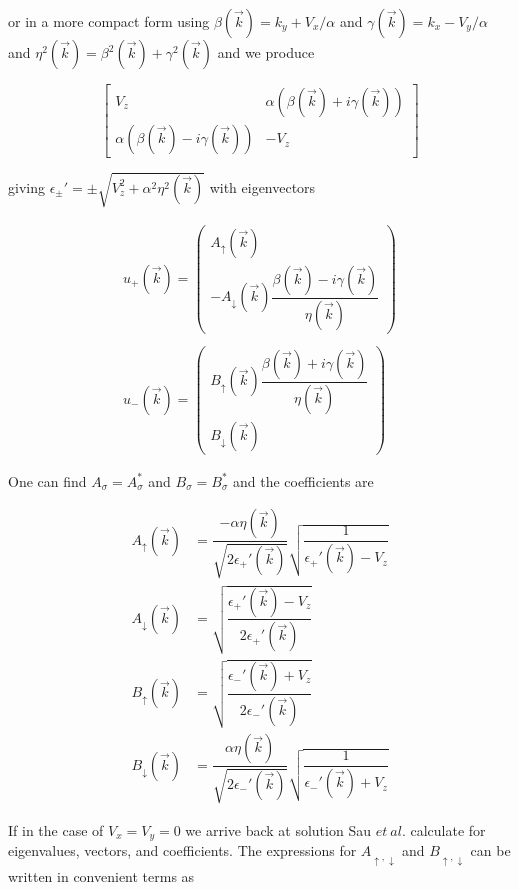 or in a more compact form using $\beta(\vec{k}) = k_y + V_x/\alpha$ and $\gamma(\vec{k}) = k_x - V_y/\alpha$ and $\eta^2(\vec{k})=\beta^2(\vec{k})+\gamma^2(\vec{k})$ and we produce

\begin{equation}
  \begin{bmatrix}
    V_z    &    \alpha(\beta(\vec{k}) + i\gamma(\vec{k})) \\
    \alpha(\beta(\vec{k}) - i\gamma(\vec{k})) &    -V_z
  \end{bmatrix}
\end{equation}

giving $\epsilon_{\pm}' = \pm \sqrt{V_z^2+\alpha^2\eta^2(\vec{k})}$ with eigenvectors

\begin{align}
  u_+(\vec{k})  =  
  \left( \begin{array}{l}
      A_\uparrow(\vec{k}) \\ 
      -A_\downarrow(\vec{k}) \dfrac{\beta(\vec{k}) - i \gamma(\vec{k})}{\eta(\vec{k})}
  \end{array} \right)
  \\ \\
  u_-(\vec{k})  =  
  \left( \begin{array}{l}
      B_\uparrow(\vec{k}) \dfrac{\beta(\vec{k}) + i \gamma(\vec{k})}{\eta(\vec{k})}  \\ 
      B_\downarrow(\vec{k})
  \end{array} \right)
\end{align}

One can find $A_{\sigma}=A_{\sigma}^*$ and $B_{\sigma}=B_{\sigma}^*$ and the coefficients are

\begin{align}
  A_{\uparrow}(\vec{k}) &= \dfrac{-\alpha\eta(\vec{k})}{\sqrt{2\epsilon_+'(\vec{k})}} \sqrt{\dfrac{1}{\epsilon_+'(\vec{k})-V_z}} \\
A_{\downarrow}(\vec{k}) &= \sqrt{\dfrac{\epsilon_+'(\vec{k})-V_z}{2\epsilon_+'(\vec{k})}} \\
B_{\uparrow}(\vec{k}) &= \sqrt{\dfrac{\epsilon_-'(\vec{k})+V_z}{2\epsilon_-'(\vec{k})}} \\ 
B_{\downarrow}(\vec{k}) &= \dfrac{\alpha\eta(\vec{k})}{\sqrt{2\epsilon_-'(\vec{k})}} \sqrt{\dfrac{1}{\epsilon_-'(\vec{k})+V_z}}
\end{align}

If in the case of $V_x=V_y=0$ we arrive back at solution Sau $\mathit{et\ al.}$ calculate for eigenvalues, vectors, and coefficients. The expressions for $A_{\uparrow,\downarrow}$ and $B_{\uparrow,\downarrow}$ can be written in convenient terms as

